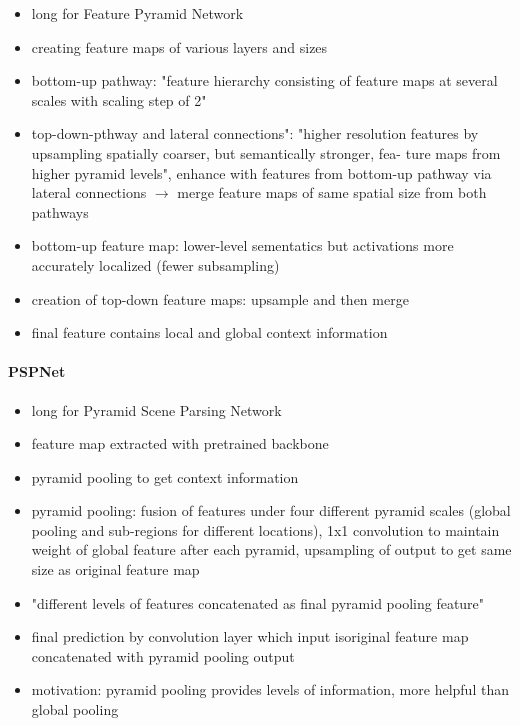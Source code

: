 \begin{itemize}
	\item long for Feature Pyramid Network
	\item creating feature maps of various layers and sizes \cite{Norelyaqine2023}
	\item bottom-up pathway: "feature hierarchy consisting of feature maps at several scales with scaling step of 2"\cite{fpn}
	\item top-down-pthway and lateral connections": "higher resolution features by upsampling spatially coarser, but semantically stronger, fea- ture maps from higher pyramid levels", enhance with features from bottom-up pathway via lateral connections $\rightarrow$ merge feature maps of same spatial size from both pathways\cite{fpn}
	\item bottom-up feature map: lower-level sementatics but activations more accurately localized (fewer subsampling)\cite{fpn}
	\item creation of top-down feature maps: upsample and then merge\cite{fpn}
	\item final feature contains local and global context information\cite{fpn}
\end{itemize}


\paragraph{PSPNet}

\begin{itemize}
	\item long for Pyramid Scene Parsing Network
	\item feature map extracted with pretrained backbone
	\item pyramid pooling to get context information
	\item pyramid pooling: fusion of features under four different pyramid scales (global pooling and sub-regions for different locations), 1x1 convolution to maintain weight of global feature after each pyramid, upsampling of output to get same size as original feature map
	\item "different levels of features concatenated as final pyramid pooling feature"
	\item final prediction by convolution layer which input isoriginal feature map concatenated with pyramid pooling output
	\item motivation: pyramid pooling provides levels of information, more helpful than global pooling
\end{itemize}

